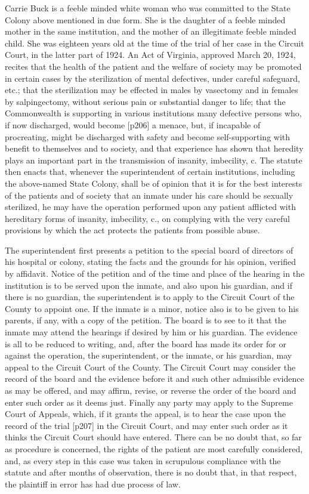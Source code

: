 \documentclass[12pt]{letter}
\begin{document}
Carrie Buck is a feeble minded white woman who was committed to the State Colony above mentioned in due form. She is the daughter of a feeble minded mother in the same institution, and the mother of an illegitimate feeble minded child. She was eighteen years old at the time of the trial of her case in the Circuit Court, in the latter part of 1924. An Act of Virginia, approved March 20, 1924, recites that the health of the patient and the welfare of society may be promoted in certain cases by the sterilization of mental defectives, under careful safeguard, etc.; that the sterilization may be effected in males by vasectomy and in females by salpingectomy, without serious pain or substantial danger to life; that the Commonwealth is supporting in various institutions many defective persons who, if now discharged, would become [p206] a menace, but, if incapable of procreating, might be discharged with safety and become self-supporting with benefit to themselves and to society, and that experience has shown that heredity plays an important part in the transmission of insanity, imbecility, c. The statute then enacts that, whenever the superintendent of certain institutions, including the above-named State Colony, shall be of opinion that it is for the best interests of the patients and of society that an inmate under his care should be sexually sterilized, he may have the operation performed upon any patient afflicted with hereditary forms of insanity, imbecility, c., on complying with the very careful provisions by which the act protects the patients from possible abuse.

The superintendent first presents a petition to the special board of directors of his hospital or colony, stating the facts and the grounds for his opinion, verified by affidavit. Notice of the petition and of the time and place of the hearing in the institution is to be served upon the inmate, and also upon his guardian, and if there is no guardian, the superintendent is to apply to the Circuit Court of the County to appoint one. If the inmate is a minor, notice also is to be given to his parents, if any, with a copy of the petition. The board is to see to it that the inmate may attend the hearings if desired by him or his guardian. The evidence is all to be reduced to writing, and, after the board has made its order for or against the operation, the superintendent, or the inmate, or his guardian, may appeal to the Circuit Court of the County. The Circuit Court may consider the record of the board and the evidence before it and such other admissible evidence as may be offered, and may affirm, revise, or reverse the order of the board and enter such order as it deems just. Finally any party may apply to the Supreme Court of Appeals, which, if it grants the appeal, is to hear the case upon the record of the trial [p207] in the Circuit Court, and may enter such order as it thinks the Circuit Court should have entered. There can be no doubt that, so far as procedure is concerned, the rights of the patient are most carefully considered, and, as every step in this case was taken in scrupulous compliance with the statute and after months of observation, there is no doubt that, in that respect, the plaintiff in error has had due process of law.
\end{document}
